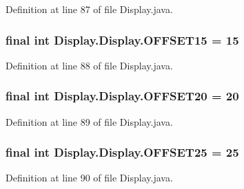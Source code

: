 Definition at line 87 of file Display.\+java.

\hypertarget{class_display_1_1_display_a3fb4f586318e61f3ad9d15d058ce15b8}{}
\subsubsection[{O\+F\+F\+S\+E\+T15}]{\setlength{\rightskip}{0pt plus 5cm}final int Display.\+Display.\+O\+F\+F\+S\+E\+T15 = 15\hspace{0.3cm}{\ttfamily [static]}}\label{class_display_1_1_display_a3fb4f586318e61f3ad9d15d058ce15b8}


Definition at line 88 of file Display.\+java.

\hypertarget{class_display_1_1_display_a2969279ab92fa68405072414fa62c987}{}
\subsubsection[{O\+F\+F\+S\+E\+T20}]{\setlength{\rightskip}{0pt plus 5cm}final int Display.\+Display.\+O\+F\+F\+S\+E\+T20 = 20\hspace{0.3cm}{\ttfamily [static]}}\label{class_display_1_1_display_a2969279ab92fa68405072414fa62c987}


Definition at line 89 of file Display.\+java.

\hypertarget{class_display_1_1_display_af6173975e03ce9913d8935d6f8040e5b}{}
\subsubsection[{O\+F\+F\+S\+E\+T25}]{\setlength{\rightskip}{0pt plus 5cm}final int Display.\+Display.\+O\+F\+F\+S\+E\+T25 = 25\hspace{0.3cm}{\ttfamily [static]}}\label{class_display_1_1_display_af6173975e03ce9913d8935d6f8040e5b}


Definition at line 90 of file Display.\+java.

\hypertarget{class_display_1_1_display_afbede7d7429e2ed899ae713864da8848}{}
